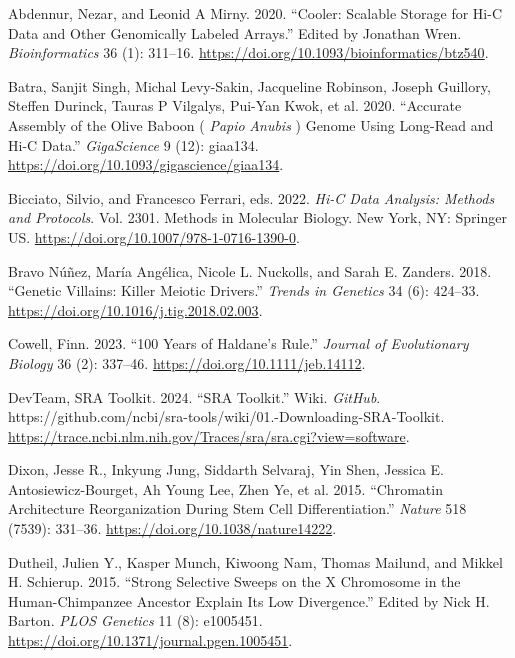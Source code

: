 \documentclass[
  11pt,
  a4paper,
]{scrbook}
\newlength{\cslhangindent}
\newenvironment{CSLReferences}[2] %
 {\begin{list}{}{%
  \setlength{\itemindent}{0pt}
  \setlength{\leftmargin}{0pt}
  \setlength{\parsep}{0pt}
  \ifodd #1
   \setlength{\leftmargin}{\cslhangindent}
   \setlength{\itemindent}{-1\cslhangindent}
  \fi
  \setlength{\itemsep}{#2\baselineskip}}}
 {\end{list}}
\let\oldemph\emph
\renewcommand\emph[1]{\oldemph{\color{gray}#1}}
\begin{document}
\label{refs}
\begin{CSLReferences}{1}{0}
Abdennur, Nezar, and Leonid A Mirny. 2020. {``Cooler: Scalable Storage
for {Hi-C} Data and Other Genomically Labeled Arrays.''} Edited by
Jonathan Wren. \emph{Bioinformatics} 36 (1): 311--16.
\url{https://doi.org/10.1093/bioinformatics/btz540}.

Batra, Sanjit Singh, Michal Levy-Sakin, Jacqueline Robinson, Joseph
Guillory, Steffen Durinck, Tauras P Vilgalys, Pui-Yan Kwok, et al. 2020.
{``Accurate Assembly of the Olive Baboon ( {\emph{Papio}}{
\emph{Anubis}} ) Genome Using Long-Read and {Hi-C} Data.''}
\emph{GigaScience} 9 (12): giaa134.
\url{https://doi.org/10.1093/gigascience/giaa134}.

Bicciato, Silvio, and Francesco Ferrari, eds. 2022. \emph{Hi-{C Data
Analysis}: {Methods} and {Protocols}}. Vol. 2301. Methods in {Molecular
Biology}. New York, NY: Springer US.
\url{https://doi.org/10.1007/978-1-0716-1390-0}.

Bravo Núñez, María Angélica, Nicole L. Nuckolls, and Sarah E. Zanders.
2018. {``Genetic {Villains}: {Killer Meiotic Drivers}.''} \emph{Trends
in Genetics} 34 (6): 424--33.
\url{https://doi.org/10.1016/j.tig.2018.02.003}.

Cowell, Finn. 2023. {``100 Years of {Haldane}'s Rule.''} \emph{Journal
of Evolutionary Biology} 36 (2): 337--46.
\url{https://doi.org/10.1111/jeb.14112}.

DevTeam, SRA Toolkit. 2024. {``{SRA Toolkit}.''} Wiki. \emph{GitHub}.
https://github.com/ncbi/sra-tools/wiki/01.-Downloading-SRA-Toolkit.
\url{https://trace.ncbi.nlm.nih.gov/Traces/sra/sra.cgi?view=software}.

Dixon, Jesse R., Inkyung Jung, Siddarth Selvaraj, Yin Shen, Jessica E.
Antosiewicz-Bourget, Ah Young Lee, Zhen Ye, et al. 2015. {``Chromatin
Architecture Reorganization During Stem Cell Differentiation.''}
\emph{Nature} 518 (7539): 331--36.
\url{https://doi.org/10.1038/nature14222}.

Dutheil, Julien Y., Kasper Munch, Kiwoong Nam, Thomas Mailund, and
Mikkel H. Schierup. 2015. {``Strong {Selective Sweeps} on the {X
Chromosome} in the {Human-Chimpanzee Ancestor Explain Its Low
Divergence}.''} Edited by Nick H. Barton. \emph{PLOS Genetics} 11 (8):
e1005451. \url{https://doi.org/10.1371/journal.pgen.1005451}.


\end{CSLReferences}
\end{document}
